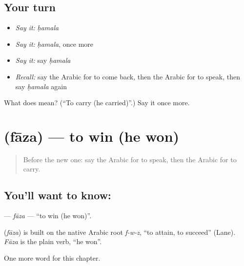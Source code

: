 \subsection*{Your turn}
\begin{itemize}
\raggedright
  \item \emph{Say it:} \emph{ḥamala}
  \item \emph{Say it:} \emph{ḥamala}, once more
  \item \emph{Say it:} say \emph{ḥamala}
  \item \emph{Recall:} say the Arabic for to come back, then the Arabic for to speak, then say \emph{ḥamala} again
\end{itemize}

\begin{tcolorbox}[breakable,colback=teal!4,colframe=teal!35!black,title={Before you move on}]
What does  mean? (\textquotedblleft{}To carry (he carried)\textquotedblright{}.) Say it once more.
\end{tcolorbox}
\section[\texorpdfstring{\ar{فاز} (fāza)}{فاز (fāza)}]{ (fāza) — to win (he won)}

\label{lesson:AR-C65-faza}



\begin{quote}
Before the new one: say the Arabic for to speak, then the Arabic for to carry.
\end{quote}

\subsection*{You'll want to know: }
\textbf{} — \emph{fāza} — \textquotedblleft{}to win (he won)\textquotedblright{}.

\begin{cousinweb}
\textbf{} (\emph{fāza}) is built on the native Arabic root \emph{f-w-z}, \textquotedblleft{}to attain, to succeed\textquotedblright{} (Lane). \emph{Fāza} is the plain verb, \textquotedblleft{}he won\textquotedblright{}.
\end{cousinweb}

\begin{grammarlens}[title={What you've built}]
One more word for this chapter.
\end{grammarlens}

